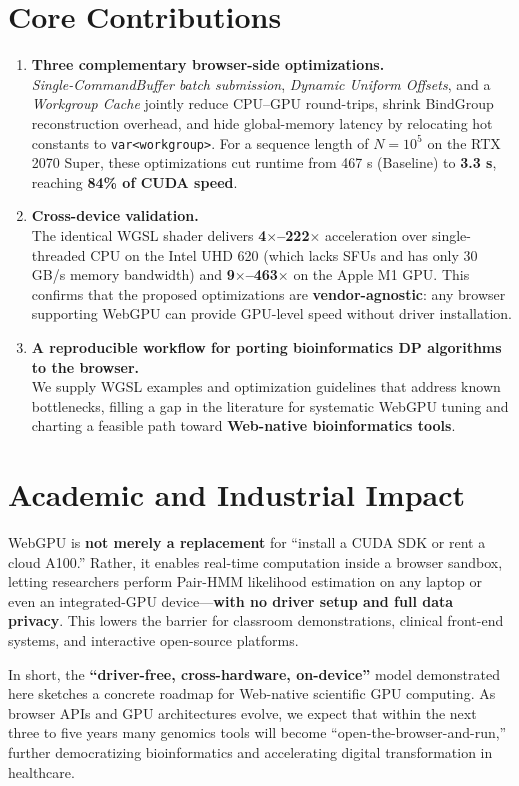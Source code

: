 \documentclass[PhD]{PHlab-thesis}
\begin{document}
\section{Core Contributions}
\begin{enumerate}
    \item \textbf{Three complementary browser-side optimizations.} \\
    \emph{Single-CommandBuffer batch submission}, \emph{Dynamic Uniform Offsets}, and a \emph{Workgroup Cache} jointly reduce CPU–GPU round-trips, shrink BindGroup reconstruction overhead, and hide global-memory latency by relocating hot constants to \texttt{var<workgroup>}. For a sequence length of $N=10^5$ on the RTX 2070 Super, these optimizations cut runtime from 467 s (Baseline) to \textbf{3.3 s}, reaching \textbf{84\% of CUDA speed}.
    \item \textbf{Cross-device validation.} \\
    The identical WGSL shader delivers \textbf{4$\times$–222$\times$} acceleration over single-threaded CPU on the Intel UHD 620 (which lacks SFUs and has only 30 GB/s memory bandwidth) and \textbf{9$\times$–463$\times$} on the Apple M1 GPU. This confirms that the proposed optimizations are \textbf{vendor-agnostic}: any browser supporting WebGPU can provide GPU-level speed without driver installation.
    \item \textbf{A reproducible workflow for porting bioinformatics DP algorithms to the browser.} \\
    We supply WGSL examples and optimization guidelines that address known bottlenecks, filling a gap in the literature for systematic WebGPU tuning and charting a feasible path toward \textbf{Web-native bioinformatics tools}.
\end{enumerate}

\section{Academic and Industrial Impact}
WebGPU is \textbf{not merely a replacement} for ``install a CUDA SDK or rent a cloud A100.'' Rather, it enables real-time computation inside a browser sandbox, letting researchers perform Pair-HMM likelihood estimation on any laptop or even an integrated-GPU device—\textbf{with no driver setup and full data privacy}. This lowers the barrier for classroom demonstrations, clinical front-end systems, and interactive open-source platforms.

In short, the \textbf{``driver-free, cross-hardware, on-device''} model demonstrated here sketches a concrete roadmap for Web-native scientific GPU computing. As browser APIs and GPU architectures evolve, we expect that within the next three to five years many genomics tools will become ``open-the-browser-and-run,'' further democratizing bioinformatics and accelerating digital transformation in healthcare.
\end{document}

